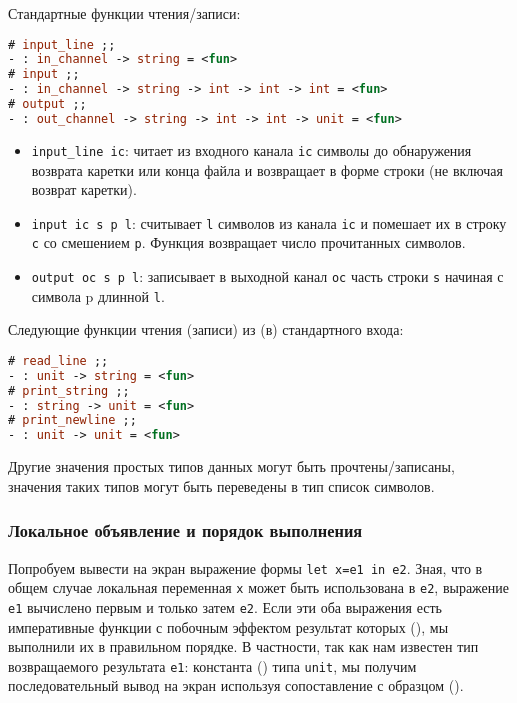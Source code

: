 Стандартные функции чтения/записи:

\begin{lstlisting}[language=OCaml]
# input_line ;;
- : in_channel -> string = <fun>
# input ;;
- : in_channel -> string -> int -> int -> int = <fun>
# output ;;
- : out_channel -> string -> int -> int -> unit = <fun>
\end{lstlisting}

\begin{itemize}
	\item \texttt{input\_line ic}: читает из входного канала \texttt{ic} символы
до обнаружения возврата каретки или конца файла и возвращает в форме строки (не
включая возврат каретки).

	\item \texttt{input ic s p l}: считывает \texttt{l} символов из канала
\texttt{ic} и помешает их в строку \texttt{c} со смешением \texttt{p}. Функция
возвращает число прочитанных символов.

	\item \texttt{output oc s p l}: записывает в выходной канал \texttt{oc}
часть строки \texttt{s} начиная с символа p длинной \texttt{l}.
\end{itemize}

Следующие функции чтения (записи) из (в) стандартного входа:

\begin{lstlisting}[language=OCaml]
# read_line ;;
- : unit -> string = <fun>
# print_string ;;
- : string -> unit = <fun>
# print_newline ;;
- : unit -> unit = <fun>
\end{lstlisting}

Другие значения простых типов данных могут быть прочтены/записаны, значения
таких типов могут быть переведены в тип список символов.

\subsubsection{Локальное объявление и порядок выполнения}

Попробуем вывести на экран выражение формы \texttt{let x=e1 in e2}. Зная, что в
общем случае локальная переменная \texttt{x} может быть использована в
\texttt{e2}, выражение \texttt{e1} вычислено первым и только затем \texttt{e2}.
Если эти оба выражения есть императивные функции с побочным эффектом результат
которых (), мы выполнили их в правильном порядке. В частности, так как нам
известен тип возвращаемого результата \texttt{e1}: константа () типа
\texttt{unit}, мы получим последовательный вывод на экран используя
сопоставление с образцом ().

